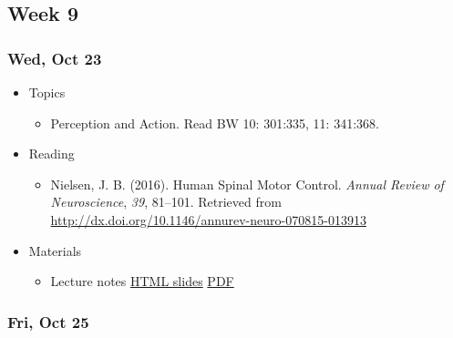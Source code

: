 \documentclass[]{article}
\providecommand{\tightlist}{%
  \setlength{\itemsep}{0pt}\setlength{\parskip}{0pt}}
\begin{document}
\hypertarget{week-9}{%
\subsection{Week 9}\label{week-9}}

\hypertarget{wed-oct-23}{%
\subsubsection{Wed, Oct 23}\label{wed-oct-23}}

\begin{itemize}
\tightlist
\item
  Topics

  \begin{itemize}
  \tightlist
  \item
    Perception and Action. Read BW 10: 301:335, 11: 341:368.
  \end{itemize}
\item
  Reading

  \begin{itemize}
  \tightlist
  \item
    Nielsen, J. B. (2016). Human Spinal Motor Control. \emph{Annual
    Review of Neuroscience}, \emph{39}, 81--101. Retrieved from
    \url{http://dx.doi.org/10.1146/annurev-neuro-070815-013913}
  \end{itemize}
\item
  Materials

  \begin{itemize}
  \tightlist
  \item
    Lecture notes \textbar{} \href{}{HTML slides} \textbar{}
    \href{}{PDF}
  \end{itemize}
\end{itemize}

\hypertarget{fri-oct-25}{%
\subsubsection{Fri, Oct 25}\label{fri-oct-25}}
\end{document}
